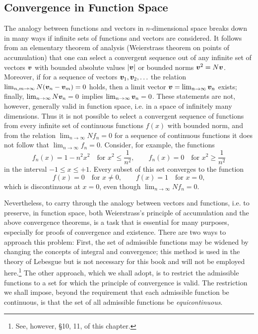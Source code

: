 \subsection{Convergence in Function Space}
The analogy between functions and vectors in $n$-dimensional space breaks down in many ways if infinite sets of functions and vectors are considered. It follows from an elementary theorem of analysis (Weierstrass theorem on points of accumulation) that one can select a convergent sequence out of any infinite set of vectors $\bm{v}$ with bounded absolute values $|\bm{v}|$ or bounded norms $\bm{v}^2=N\bm{v}$. Moreover, if for a sequence of vectors $\bm{v}_1,\bm{v}_2,\ldots$ the relation $\lim_{n,m\to\infty}N(\bm{v}_n-\bm{v}_m)=0$ holds, then a limit vector $\bm{v}=\lim_{n\to\infty}\bm{v}_n$ exists; finally, $\lim_{n\to\infty}N\bm{v}_n=0$ implies $\lim_{n\to\infty}\bm{v}_n=0$. These statements are not, however, generally valid in function space, i.e. in a space of infinitely many dimensions. Thus it is not possible to select a convergent sequence of functions from every infinite set of continuous functions $f(x)$ with bounded norm, and from the relation $\lim_{n\to\infty}Nf_n=0$ for a sequence of continuous functions it does not follow that $\lim_{n\to\infty}f_n=0$. Consider, for example, the functions
\[
f_n(x)=1-n^2x^2\quad\text{for }x^2\le\frac1{n^2},
\qquad
f_n(x)=0\quad\text{for }x^2\ge\frac1{n^2}
\]
in the interval $-1\le x\le+1$. Every subset of this set converges to the function
\[
f(x)=0\quad\text{for }x\ne0,
\qquad
f(x)=1\quad\text{for }x=0,
\]
which is discontinuous at $x=0$, even though $\lim_{n\to\infty}Nf_n=0$.

Nevertheless, to carry through the analogy between vectors and functions, i.e. to preserve, in function space, both Weierstrass's principle of accumulation and the above convergence theorems, is a task that is essential for many purposes, especially for proofs of convergence and existence. There are two ways to approach this problem: First, the set of admissible functions may be widened by changing the concepts of integral and convergence; this method is used in the theory of Lebesgue but is not necessary for this book and will not be employed here.\footnote{See, however, \S10, 11, of this chapter.} The other approach, which we shall adopt, is to restrict the admissible functions to a set for which the principle of convergence is valid. The restriction we shall impose, beyond the requirement that each admissible function be continuous, is that the set of all admissible functions be \emph{equicontinuous}.

